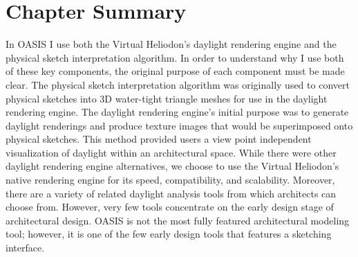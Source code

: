 \section{Chapter Summary}

In OASIS I use both the Virtual Heliodon's daylight rendering engine and the physical sketch interpretation algorithm.  In order to understand why I use both of these key components, the original purpose of each component must be made clear.  The physical sketch interpretation algorithm was originally used to convert physical sketches into 3D water-tight triangle meshes for use in the daylight rendering engine.  The daylight rendering engine's initial purpose was to generate daylight renderings and produce texture images that would be superimposed onto physical sketches.  This method provided users a view point independent visualization of daylight within an architectural space.  While there were other daylight rendering engine alternatives, we choose to use the Virtual Heliodon's native rendering engine for its speed, compatibility, and scalability.  Moreover, there are a variety of related daylight analysis tools from which architects can choose from.  However, very few tools concentrate on the early design stage of architectural design.  OASIS is not the most fully featured architectural modeling tool; however, it is one of the few early design tools that features a sketching interface. \\
